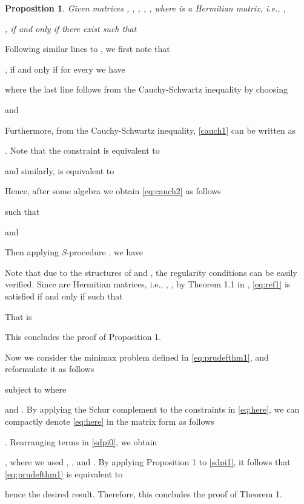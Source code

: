 \documentclass[review,sort&compress]{elsarticle}
\newtheorem{prop}{Proposition}
\begin{document}
\begin{prop}\label{prop1}
Given matrices , , , , , where  is a Hermitian matrix, i.e., ,

, if and only if there exist  such that

\end{prop}

\begin{pop1}
Following similar lines to \cite{yonina1}, we first note that

, if and only if for every  we have

where the last line follows from the Cauchy-Schwartz inequality by choosing

and

Furthermore, from the Cauchy-Schwartz inequality, \eqref{cauch1} can be written as

. Note that the constraint  is equivalent to

and similarly,  is equivalent to

Hence, after some algebra we obtain \eqref{eq:cauch2} as follows

 such that

and

Then applying {\em S}-procedure \cite{boyd}, we have

Note that due to the structures of  and , the regularity conditions can be easily verified. Since  are Hermitian matrices, i.e., , , by Theorem 1.1 in \cite{s1}, \eqref{eq:ref1} is satisfied if and only if  such that

That is

This concludes the proof of Proposition 1. \hfill 
\end{pop1}

Now we consider the minimax problem defined in \eqref{eq:prudefthm1}, and reformulate it as follows

subject to 
where

and . By applying the Schur complement to the constraints in \eqref{eq:here}, we can compactly denote \eqref{eq:here} in the matrix form as follows

. Rearranging terms in \eqref{sdpi0}, we obtain

, where we used , , and . By applying Proposition 1 to \eqref{sdpi1}, it follows that \eqref{eq:prudefthm1} is equivalent to

hence the desired result. Therefore, this concludes the proof of Theorem 1. \hfill 
\end{document}
